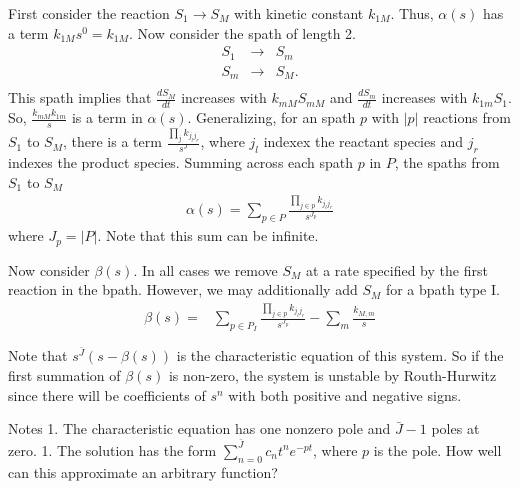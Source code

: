\documentclass[unnumsec,webpdf,contemporary,large]{oup-authoring-template}%
\theoremstyle{thmstyleone}%
\theoremstyle{thmstyletwo}%
\theoremstyle{thmstylethree}%
\begin{document}
First consider the reaction $S_1 \rightarrow S_M$ with kinetic constant $k_{1M}$. Thus, $\alpha(s)$ has a term $k_{1M} s^0 = k_{1M}$.
Now consider the spath of length 2.
\begin{eqnarray}
S_1 & \rightarrow & S_m \\
S_m & \rightarrow & S_M . \\
\end{eqnarray}
This spath implies that $\frac{d S_M}{d t}$ increases with $k_{mM} S_{mM}$ and $\frac{d S_m}{d t}$ increases with $k_{1m} S_1$. So, $\frac{k_{mM}k_{1m}}{s}$ is a term in $\alpha(s)$. Generalizing, for an spath $p$ with $|p|$ reactions from $S_1$ to $S_M$, there is a term $\frac{\prod_j k_{j_l j_r}}{s^J}$, where $j_l$ indexex the reactant species and $j_r$ indexes the product species. Summing across each spath $p$ in $P$, the spaths from $S_1$ to $S_M$
\begin{eqnarray}
\alpha(s) = \sum_{p \in P} \frac{\prod_{j \in p} k_{j_l j_r}}{s^{J_p}}
\end{eqnarray}
where $J_p = |P|$. Note that this sum can be infinite.

Now consider $\beta(s)$. In all cases we remove $S_M$ at a rate specified by the first reaction in the bpath. However, we may additionally add $S_M$ for a bpath type I.
\begin{eqnarray}
\beta(s)  =
&
\sum_{p \in P_I }
 \frac{\prod_{j \in p} k_{j_l j_r}}{s^{J_p}}
- \sum_{m} \frac{k_{M, m}}{s} \\
 \\
\end{eqnarray}
Note that $s^{\bar{J}} (s - \beta(s))$ is the characteristic equation of this system. So if the first summation of $\beta(s)$ is non-zero, the system is unstable by Routh-Hurwitz since there will be coefficients of $s^n$ with both positive and negative signs.

Notes
1. The characteristic equation has one nonzero pole and $\bar{J} -1$ poles at zero.
1. The solution has the form $\sum_{n=0}^{\bar{J}} c_n t^n e^{-pt}$, where $p$ is the pole. How well can this approximate an arbitrary function?
\end{document}
